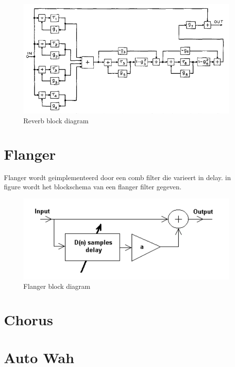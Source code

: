 \documentclass[11pt]{article} %
\begin{document}
\begin{figure}
	\centering
	\includegraphics[scale=0.8]{ReverbBlockDiagram.png}
	\caption{Reverb block diagram}
	\label{Fig:ReverbBlockDiagram}
\end{figure}

\section{Flanger}

Flanger wordt geimplementeerd door een comb filter die varieert in delay. \newline
in figure \cite{Fig:FlangerBlockDiagram} wordt het blockschema van een flanger filter gegeven.

\begin{figure}
	\centering
	\includegraphics[scale=0.3]{FlangerBlockDiagram.png}
	\caption{Flanger block diagram}
	\label{Fig:FlangerBlockDiagram}
\end{figure}


\section{Chorus}

\cite{Sound Effects}

\section{Auto Wah}
\end{document}

